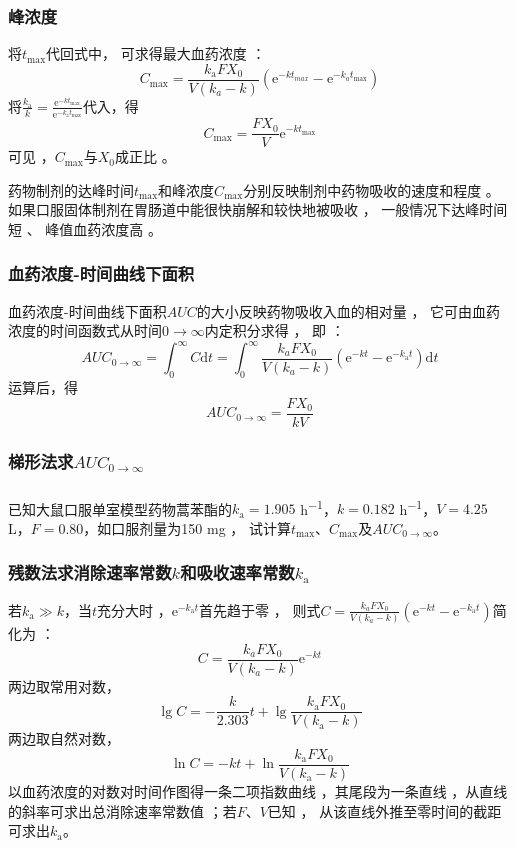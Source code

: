 \documentclass[dvipsnames, svgnames, x11names]{beamer}
\begin{document}
\begin{frame}
    \frametitle{峰浓度}
    将$t_\mathrm{max}$代回式中， 可求得最大血药浓度 ：
    \[
        C_{\mathrm{max}}=\frac{k_{\mathrm{a}}FX_{0}}{V(k_{{a}}-k)}(\mathrm{e}^{-kt_{{max}}}-\mathrm{e}^{-k_{{a}}t_{{\mathrm{max}}}})
    \]
    将$\frac{k_\mathrm{a}}k=\frac{\mathrm{e}^{-kt_\mathrm{max}}}{\mathrm{e}^{-k_\mathrm{a}t_\mathrm{max}}}$代入，得
    \[
        C_{\mathrm{max}}=\frac{FX_{0}}{V}\mathrm{e}^{-kt_{\mathrm{max}}}
    \]
    可见 ，$C_\mathrm{max}$与$X_{0}$成正比 。 
    \begin{blankblock}{}
        药物制剂的达峰时间$t_\mathrm{max}$和峰浓度$C_\mathrm{max}$分别反映制剂中药物吸收的速度和程度 。 如果口服固体制剂在胃肠道中能很快崩解和较快地被吸收 ， 一般情况下达峰时间短 、 峰值血药浓度高 。
    \end{blankblock}
    
\end{frame}


\begin{frame}
    \frametitle{血药浓度-时间曲线下面积}
    血药浓度-时间曲线下面积$AUC$的大小反映药物吸收入血的相对量 ， 它可由血药浓度的时间函数式从时间$0\to \infty$内定积分求得 ， 即 ：
    \[
        AUC_{0\to\infty}=\int_0^\infty C\mathrm{d}t=\int_0^\infty\frac{k_aFX_0}{V(k_a-k)}(\mathrm{e}^{-kt}-\mathrm{e}^{-k_\mathrm{a}t})\mathrm{d}t
    \]
    运算后，得
    \[
        AUC_{0\to\infty}=\frac{FX_{0}}{kV}
    \]
\end{frame}


\begin{frame}
    \frametitle{梯形法求$AUC_{0\to\infty}$}
\end{frame}


\begin{frame}[t]
    \frametitle{}
    \begin{example}
        已知大鼠口服单室模型药物蒿苯酯的$k_\mathrm{a}=1.905$ \si{h^{-1}}，$k=0.182$ \si{h^{-1}}，$V=4.25$ \si{L}，$F=0.80$，如口服剂量为150 mg ， 试计算$t_\mathrm{max}$、$C_\mathrm{max}$及$AUC_{0\to\infty}$。
    \end{example}
\end{frame}


\begin{frame}
    \frametitle{残数法求消除速率常数$k$和吸收速率常数$k_\mathrm{a}$}
    若$k_\mathrm{a}\gg k$，当$t$充分大时 ，$\mathrm{e}^{-k_\mathrm{a}t}$首先趋于零 ， 则式$C=\frac{k_{a}FX_0}{V(k_{a}-k)}(\mathrm{e}^{-kt}-\mathrm{e}^{-k_\mathrm{a}t})$简化为 ：
    \[
        C=\frac{k_{a}FX_0}{V(k_{a}-k)}\mathrm{e}^{-kt}
    \]
    两边取常用对数，
    \[
        \lg C=-\frac{k}{2.303}t+\lg\frac{k_{\mathrm{a}}FX_{0}}{V(k_{\mathrm{a}}-k)}
    \]
    两边取自然对数，
    \[
        \ln C=-kt+\ln\frac{k_{\mathrm{a}}FX_{0}}{V(k_{\mathrm{a}}-k)}
    \]
    以血药浓度的对数对时间作图得一条二项指数曲线 ，其尾段为一条直线 ，从直线的斜率可求出总消除速率常数值 ；若$F$、$V$已知 ， 从该直线外推至零时间的截距可求出$k_{\mathrm{a}}$。
\end{frame}
\end{document}
